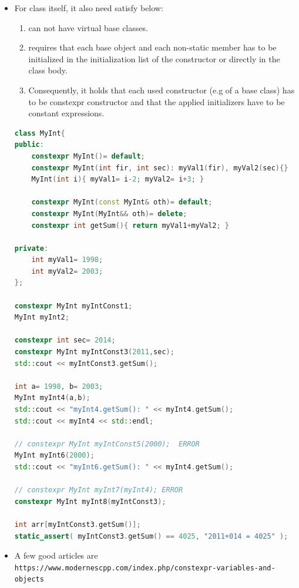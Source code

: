 \documentclass[a4paper,12pt,twoside]{book}
\begin{document}
\begin{itemize}
\item For class itself, it also need satisfy below:
\begin{enumerate}
	\item can not have virtual base classes.
	\item requires that each base object and each non-static member has to be initialized in the initialization list of the constructor or directly in the class body. 
	\item Consequently, it holds that each used constructor (e.g of a base class) has to be constexpr constructor and that the applied initializers have to be constant expressions.
\end{enumerate}
\begin{lstlisting}[frame=single, language=c++]
class MyInt{
public:
	constexpr MyInt()= default;
	constexpr MyInt(int fir, int sec): myVal1(fir), myVal2(sec){}
	MyInt(int i){ myVal1= i-2; myVal2= i+3; }
	
	constexpr MyInt(const MyInt& oth)= default;
	constexpr MyInt(MyInt&& oth)= delete;
	constexpr int getSum(){ return myVal1+myVal2; }

private:
	int myVal1= 1998;
	int myVal2= 2003;
};

constexpr MyInt myIntConst1;
MyInt myInt2;

constexpr int sec= 2014;
constexpr MyInt myIntConst3(2011,sec);
std::cout << myIntConst3.getSum();

int a= 1998, b= 2003;
MyInt myInt4(a,b);
std::cout << "myInt4.getSum(): " << myInt4.getSum();
std::cout << myInt4 << std::endl;

// constexpr MyInt myIntConst5(2000);  ERROR
MyInt myInt6(2000);
std::cout << "myInt6.getSum(): " << myInt4.getSum();

// constexpr MyInt myInt7(myInt4); ERROR
constexpr MyInt myInt8(myIntConst3);

int arr[myIntConst3.getSum()];
static_assert( myIntConst3.getSum() == 4025, "2011+014 = 4025" );
\end{lstlisting}

\item A few good articles are \verb|https://www.modernescpp.com/index.php/constexpr-variables-and-objects|

\end{itemize}
\end{document}
